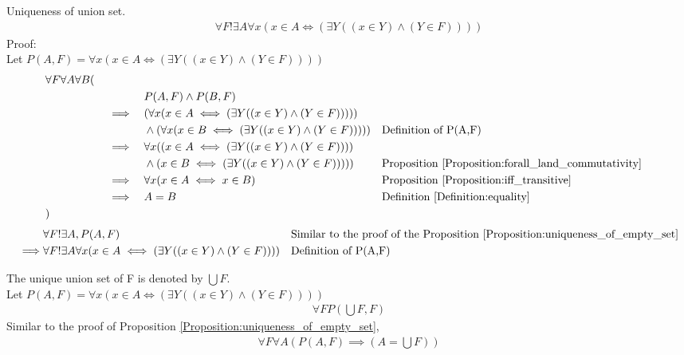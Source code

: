 \begin{prop}
\label{Proposition:uniqueness_of_union_set}
Uniqueness of union set.
\begin{align*}
\forall F !\exists A \forall x (x \in A \iff (\exists Y ((x \in Y) \land (Y \in F))))
\end{align*}
Proof: \\
Let $P(A,F) =  \forall x (x \in A \iff (\exists Y ((x \in Y) \land (Y \in F))))$
\begin{align*}
& \forall F \forall A \forall B ( \\
& \quad && &&  P(A,F) \land P(B,F) \\
& \quad && \implies &&  ( \forall x (x \in A \iff (\exists Y ((x \in Y) \land (Y \in F)))) ) \\
& \quad && && \land      ( \forall x (x \in B \iff (\exists Y ((x \in Y) \land (Y \in F)))) )
&& \text{Definition of P(A,F)} \\
& \quad && \implies &&  \forall x ( (x \in A \iff (\exists Y ((x \in Y) \land (Y \in F)))) \\
& \quad && && \land                    (x \in B \iff (\exists Y ((x \in Y) \land (Y \in F)))) )
&& \text{Proposition \ref{Proposition:forall_land_commutativity}} \\
& \quad && \implies && \forall x (x \in A \iff x \in B)
&& \text{Proposition \ref{Proposition:iff_transitive}} \\
& \quad && \implies && A = B
&& \text{Definition \ref{Definition:equality}} \\
& )
\end{align*}
\begin{align*}
& \forall F !\exists A, P(A,F)
&& \text{Similar to the proof of the Proposition \ref{Proposition:uniqueness_of_empty_set}} \\
\implies & \forall F !\exists A \forall x (x \in A \iff (\exists Y ((x \in Y) \land (Y \in F)))) && \text{Definition of P(A,F)} \\
\end{align*}
\end{prop}

\begin{defn}
\label{Definition:union_set}
The unique union set of F is denoted by $\bigcup F$. \\
Let $P(A,F) =  \forall x (x \in A \iff (\exists Y ((x \in Y) \land (Y \in F))))$ \\
\begin{align*}
\forall F P(\bigcup F, F)
\end{align*}
Similar to the proof of Proposition \ref{Proposition:uniqueness_of_empty_set},
\begin{align*}
\forall F \forall A (P(A,F) \implies (A= \bigcup F ))
\end{align*}
\end{defn}

